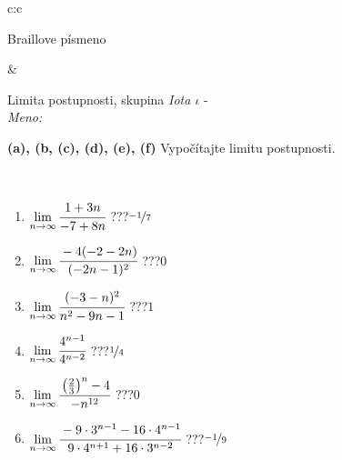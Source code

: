 \documentclass[10pt]{report}
\begin{document}
\begin{tabular}{c:c}
\begin{minipage}[c][104.5mm][t]{0.5\linewidth}
\begin{center}
\begin{minipage}{0.20\linewidth}
\begin{center}
{\small Braillove písmeno}
\end{center}
\end{minipage}
\end{center}
\end{minipage}
&
\begin{minipage}[c][104.5mm][t]{0.5\linewidth}
\begin{center}
\vspace{5mm}
{\huge Limita postupnosti, skupina \textit{Iota $\iota$} -}\\[5mm]
\textit{Meno:}\phantom{xxxxxxxxxxxxxxxxxxxxxxxxxxxxxxxxxxxxxxxxxxxxxxxxxxxxxxxxxxxxxxxxx}\\[5mm]
\begin{minipage}{0.95\linewidth}
\begin{center}
{
\textbf{(a), (b, (c), (d), (e), (f)} Vypočítajte limitu postupnosti. \\[-1mm]
\phantom{x}
}
\end{center}
\end{minipage}
\\[1mm]
\begin{minipage}{0.79\linewidth}
\begin{center}
\begin{varwidth}{\linewidth}
\setlength{\itemsep}{0pt}
\begin{enumerate}
\normalsize
\item $\lim\limits_{n\to\infty}\cfrac{1+3n}{-7+8n}$\quad \dotfill\; ???\;\dotfill \quad $\nicefrac{-1}{7}$
\item $\lim\limits_{n\to\infty}\cfrac{-4(-2-2n)}{(-2n-1)^2}$\quad \dotfill\; ???\;\dotfill \quad $0$
\item $\lim\limits_{n\to\infty}\cfrac{(-3-n)^2}{n^2-9n-1}$\quad \dotfill\; ???\;\dotfill \quad $1$
\item $\lim\limits_{n\to\infty}\cfrac{4^{n-1}}{4^{n-2}}$\quad \dotfill\; ???\;\dotfill \quad $\nicefrac{1}{4}$
\item $\lim\limits_{n\to\infty}\cfrac{\left(\frac{2}{3}\right)^n -4}{-n^{12}}$\quad \dotfill\; ???\;\dotfill \quad $0$
\item $\lim\limits_{n\to\infty}\cfrac{-9\cdot 3^{n-1}-16\cdot 4^{n-1}}{9\cdot 4^{n+1}+16\cdot 3^{n-2}}$\quad \dotfill\; ???\;\dotfill \quad $\nicefrac{-1}{9}$
\end{enumerate}
\end{varwidth}
\end{center}
\end{minipage}
\begin{minipage}{0.20\linewidth}

\end{minipage}
\end{center}
\end{minipage}
\end{tabular}
\end{document}
